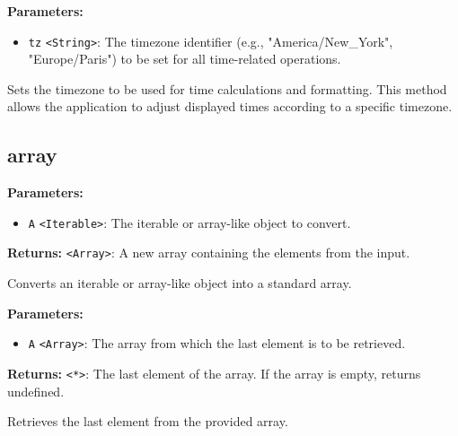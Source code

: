 \documentclass[12pt,a4paper]{article}
\begin{document}
\noindent \textbf{Parameters:}
\begin{itemize}
  \item \texttt{tz} \texttt{<String>}: The timezone identifier (e.g., "America/New\_York", "Europe/Paris") to be set for all time-related operations.
\end{itemize}

\noindent Sets the timezone to be used for time calculations and formatting. This method allows the application to adjust displayed times according to a specific timezone.


\subsection{array}
\vspace{5mm}
\noindent {}


\noindent \textbf{Parameters:}
\begin{itemize}
  \item \texttt{A} \texttt{<Iterable>}: The iterable or array-like object to convert.
\end{itemize}

\noindent \textbf{Returns:} \texttt{<Array>}: A new array containing the elements from the input.

\noindent Converts an iterable or array-like object into a standard array.

\vspace{5mm}
\noindent {}


\noindent \textbf{Parameters:}
\begin{itemize}
  \item \texttt{A} \texttt{<Array>}: The array from which the last element is to be retrieved.
\end{itemize}

\noindent \textbf{Returns:} \texttt{<*>}: The last element of the array. If the array is empty, returns undefined.

\noindent Retrieves the last element from the provided array.

\vspace{5mm}
\noindent {}
\end{document}
